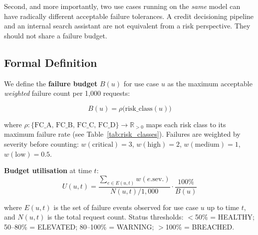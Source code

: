 \documentclass{article}
\begin{document}
Second, and more importantly, two use cases running on the \emph{same} model
can have radically different acceptable failure tolerances.  A credit
decisioning pipeline and an internal search assistant are not equivalent from
a risk perspective.  They should not share a failure budget.

\subsection{Formal Definition}

We define the \textbf{failure budget} $B(u)$ for use case $u$ as the maximum
acceptable \emph{weighted} failure count per 1{,}000 requests:

\begin{equation}
  B(u) = \rho \bigl( \text{risk\_class}(u) \bigr)
  \label{eq:budget}
\end{equation}

where $\rho : \{\text{FC\_A, FC\_B, FC\_C, FC\_D}\} \to \mathbb{R}_{>0}$
maps each risk class to its maximum failure rate (see Table~\ref{tab:risk_classes}).
Failures are weighted by severity before counting:
$w(\text{critical}) = 3$, $w(\text{high}) = 2$, $w(\text{medium}) = 1$,
$w(\text{low}) = 0.5$.

\textbf{Budget utilisation} at time $t$:
\begin{equation}
  U(u, t) = \frac{\sum_{e \in E(u,t)} w(e.\text{sev.})}{N(u,t) / 1{,}000}
             \cdot \frac{100\%}{B(u)}
  \label{eq:utilisation}
\end{equation}

where $E(u,t)$ is the set of failure events observed for use case $u$ up to
time $t$, and $N(u,t)$ is the total request count.  Status thresholds:
$<$50\% = HEALTHY; 50--80\% = ELEVATED; 80--100\% = WARNING; $>$100\% = BREACHED.

\begin{table}[t]
\caption{Failure budget risk classes, with calibration drawn from regulated
deployment practice \citep{euaiact2024,dora2022,fcaconsumerduty2024}.}
\label{tab:risk_classes}
\centering
\small
{}
\end{table}
\end{document}
